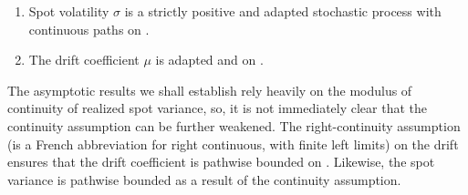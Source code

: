 \begin{ass}\label{as:vol}\mbox{} 
  \begin{enumerate}
    \item Spot volatility $\sigma$ is a strictly positive and adapted stochastic process  with continuous paths on \domain.  
    \item The drift coefficient $\mu$ is adapted and \cadlag on \domain. 
  \end{enumerate}
\end{ass}
\noindent The asymptotic results we shall establish  rely heavily on the modulus of continuity of realized spot variance, so, it is not immediately clear that the continuity assumption can be further weakened.     
The right-continuity assumption (\cadlag is a French abbreviation for right continuous, with finite left limits)  on the drift ensures that the drift coefficient is pathwise bounded on \domain. Likewise, the spot variance is pathwise bounded as a result of the continuity assumption.   
